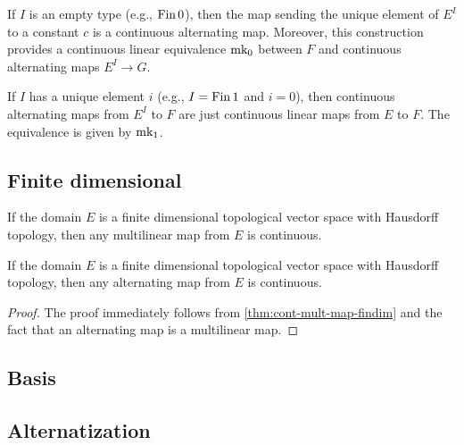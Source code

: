 \begin{definition}%
  \label{def:cont-alt-map-zero}
  If \(I\) is an empty type (e.g., \(\operatorname{Fin} 0\)),
  then the map sending the unique element of \(E^{I}\) to a constant \(c\)
  is a continuous alternating map.
  Moreover, this construction provides a continuous linear equivalence \(\operatorname{mk_0}\)
  between \(F\) and continuous alternating maps \(E^{I} \to G\).
\end{definition}

\begin{definition}%
  \label{def:cont-alt-map-one}
  If \(I\) has a unique element \(i\) (e.g., \(I = \operatorname{Fin} 1\) and \(i = 0\)),
  then continuous alternating maps from \(E^{I}\) to \(F\) are just continuous linear maps from \(E\) to \(F\).
  The equivalence is given by \(\operatorname{mk_1}\).
\end{definition}

\subsection{Finite dimensional}%
\label{sec:finite-dimensional}

\begin{theorem}%
  \label{thm:cont-mult-map-findim}
  If the domain \(E\) is a finite dimensional topological vector space with Hausdorff topology,
  then any multilinear map from \(E\) is continuous.
\end{theorem}

\begin{theorem}%
  \label{thm:cont-alt-map-findim}
  If the domain \(E\) is a finite dimensional topological vector space with Hausdorff topology,
  then any alternating map from \(E\) is continuous.
\end{theorem}
\begin{proof}
  The proof immediately follows from \autoref{thm:cont-mult-map-findim} and the fact that an alternating map is a multilinear map.
\end{proof}
\subsection{Basis}%
\label{sec:basis}


\subsection{Alternatization}%
\label{sec:alternatization}

